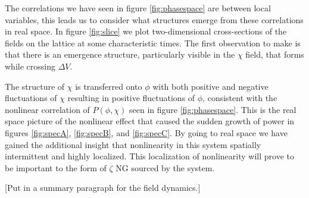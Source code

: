 

The correlations we have seen in figure \ref{fig:phasespace} are between local variables, this leads us to consider what structures emerge from these correlations in real space.
In figure \ref{fig:slice} we plot two-dimensional cross-sections of the fields on the lattice at some characteristic times.
The first observation to make is that there is an emergence structure, particularly visible in the $\chi$ field, that forms while crossing $\Delta V$.

The structure of $\chi$ is transferred onto $\phi$ with both positive and negative fluctuations of $\chi$ resulting in positive fluctuations of $\phi$, consistent with the nonlinear correlation of $P(\phi,\chi)$ seen in figure \ref{fig:phasespace}.
This is the real space picture of the nonlinear effect that caused the sudden growth of power in figures \ref{fig:specA}, \ref{fig:specB}, and \ref{fig:specC}.
By going to real space we have gained the additional insight that nonlinearity in this system spatially intermittent and highly localized.
This localization of nonlinearity will prove to be important to the form of $\zeta$ NG sourced by the system.


[Put in a summary paragraph for the field dynamics.]






